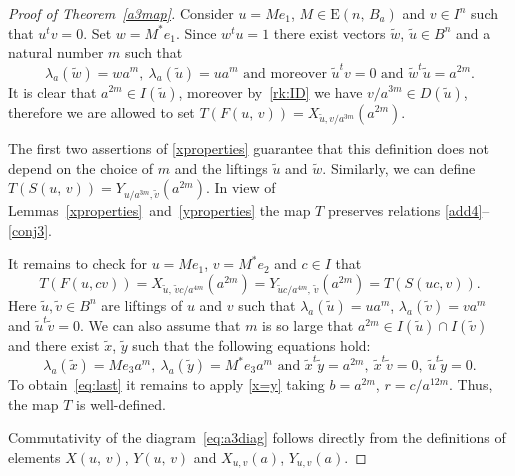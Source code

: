 \documentclass[11pt]{amsart}
\theoremstyle{plain} \declaretheorem[name=Theorem, Refname={Theorem,Theorems}]{tm} \Crefname{tm}{Theorem}{Theorems}
\numberwithin{equation}{section}
\theoremstyle{definition} \newtheorem{df}[lm]{Definition} \Crefname{df}{Definition}{Definitions}
\theoremstyle{remark} \newtheorem{rk}[lm]{Remark} \Crefname{rk}{Remark}{Remarks}
\newcommand{\E}{{\mathrm{E}}}
\begin{document}
\begin{proof}[Proof of Theorem~\ref{a3map}]
Consider $u=Me_1$, $M\in\E(n,\,B_a)$ and $v\in I^n$ such that $u^tv=0$.
Set $w=M^*e_1$. Since $w^tu=1$ there exist vectors $\tilde w$, $\tilde u\in B^n$ and a natural number $m$ such that 
$$ \lambda_a(\tilde{w})=wa^m,\ \lambda_a(\tilde{u})=ua^m\text{ and moreover }\tilde u^tv=0\text{ and }\tilde w^t\tilde u=a^{2m}.$$
It is clear that $a^{2m}\in I(\tilde u)$, moreover by~\cref{rk:ID} we have $v/a^{3m} \in D(\tilde u)$, therefore we are allowed to set $T(F(u,\,v))=X_{\tilde u,v/a^{3m}}(a^{2m})$. 

The first two assertions of \cref{xproperties} guarantee that this definition does not depend on the choice of $m$ and the liftings $\tilde u$ and $\tilde w$.
Similarly, we can define $T(S(u,\,v))=Y_{u/a^{3m},\tilde v}(a^{2m})$.
In view of Lemmas~\ref{xproperties}~and~\ref{yproperties} the map $T$ preserves relations \eqref{add4}--\eqref{conj3}.

It remains to check for $u = Me_1$, $v=M^*e_2$ and $c\in I$ that 
\begin{equation}T(F(u, cv)) = X_{\tilde u,\,\tilde v c/a^{4m}}(a^{2m}) = Y_{\tilde uc/a^{4m},\, \tilde v}(a^{2m}) = T(S(uc, v)). \label{eq:last}\end{equation}
Here $\tilde u, \tilde v \in B^n$ are liftings of $u$ and $v$ such that $\lambda_a(\tilde u)= ua^m$, $\lambda_a(\tilde v)= va^m$ and $\tilde u^t \tilde v = 0$.
We can also assume that $m$ is so large that $a^{2m}\in I(\tilde{u})\cap I(\tilde{v})$ and there exist $\tilde{x}$, $\tilde{y}$ such that the following equations hold:
$$\lambda_a(\tilde{x})=Me_3a^m,\ \lambda_a(\tilde{y})=M^*e_3a^m\text{ and }\tilde{x}^t\tilde{y}=a^{2m},\ \tilde{x}^t\tilde{v} = 0,\ \tilde{u}^t\tilde{y} =0.$$
To obtain~\eqref{eq:last} it remains to apply \cref{x=y} taking $b=a^{2m}$, $r=c/a^{12m}$.
Thus, the map $T$ is well-defined.

Commutativity of the diagram~\eqref{eq:a3diag} follows directly from the definitions of elements $X(u,\,v)$, $Y(u,\,v)$ and $X_{u,v}(a)$, $Y_{u,v}(a)$. \end{proof}

\printbibliography
\end{document}
